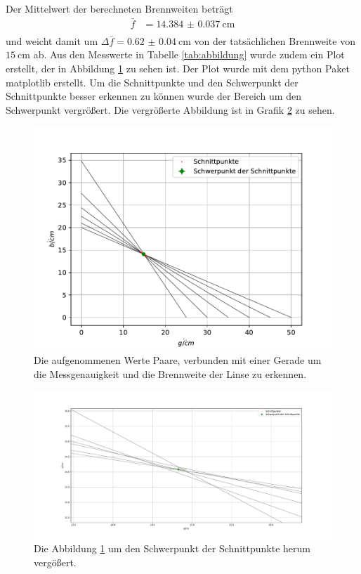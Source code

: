 Der Mittelwert der berechneten Brennweiten beträgt 
\begin{align*}
 \bar{f} & =  \SI{14.384(37)}{\centi\meter}\\
\end{align*}
und weicht damit um $\Delta \bar{f} = \SI{0.62(4)}{\centi\meter}$ von der tatsächlichen Brennweite von $\SI{15}{\centi\meter}$ ab.
Aus den Messwerte in Tabelle \ref{tab:abbildung} wurde zudem ein Plot erstellt, der in Abbildung \ref{fig:brennweite} zu sehen ist.
Der Plot wurde mit dem python Paket matplotlib \cite{matplotlib} erstellt.
Um die Schnittpunkte und den Schwerpunkt der Schnittpunkte besser erkennen zu können wurde der Bereich um den Schwerpunkt vergrößert.
Die vergrößerte Abbildung ist in Grafik \ref{fig:zoom} zu sehen.
\begin{figure} 
    \centering
    \includegraphics[width=\textwidth]{content/data/brennweite.pdf}
    \caption{Die aufgenommenen Werte Paare, verbunden mit einer Gerade um die Messgenauigkeit und die Brennweite der Linse zu erkennen.}
    \label{fig:brennweite}
\end{figure}
\begin{figure}
    \centering
    \includegraphics[width=\textwidth]{content/data/zoom_schnittpunkt.pdf}
    \caption{Die Abbildung \ref{fig:brennweite} um den Schwerpunkt der Schnittpunkte herum vergößert.}
    \label{fig:zoom}
\end{figure}
